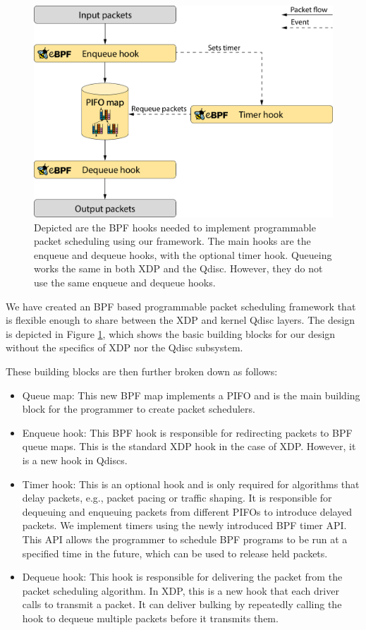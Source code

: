 \documentclass[sigconf, nonacm]{acmart}
\begin{document}
\begin{figure}

  \includegraphics[width=\linewidth]{bpf_pps_flow.pdf}

  \caption{Depicted are the BPF hooks needed to implement programmable packet scheduling using our framework. The main hooks are the enqueue and dequeue hooks, with the optional timer hook. Queueing works the same in both XDP and the Qdisc. However, they do not use the same enqueue and dequeue hooks.}
  \label{fig:bpf_pps_flow}
\end{figure}

We have created an BPF based programmable packet scheduling framework that is flexible enough to share between the XDP and kernel Qdisc layers. The design is depicted in Figure \ref{fig:bpf_pps_flow}, which shows the basic building blocks for our design without the specifics of XDP nor the Qdisc subsystem.

These building blocks are then further broken down as follows:

\begin{itemize}
        \item Queue map: This new BPF map implements a PIFO and is the main building block for the programmer to create packet schedulers.
        \item Enqueue hook: This BPF hook is responsible for redirecting packets to BPF queue maps. This is the standard XDP hook in the case of XDP. However, it is a new hook in Qdiscs.
        \item Timer hook: This is an optional hook and is only required for algorithms that delay packets, e.g., packet pacing or traffic shaping. It is responsible for dequeuing and enqueuing packets from different PIFOs to introduce delayed packets. We implement timers using the newly introduced BPF timer API. This API allows the programmer to schedule BPF programs to be run at a specified time in the future, which can be used to release held packets.
        \item Dequeue hook: This hook is responsible for delivering the packet from the packet scheduling algorithm. In XDP, this is a new hook that each driver calls to transmit a packet. It can deliver bulking by repeatedly calling the hook to dequeue multiple packets before it transmits them.
\end{itemize}
\end{document}
